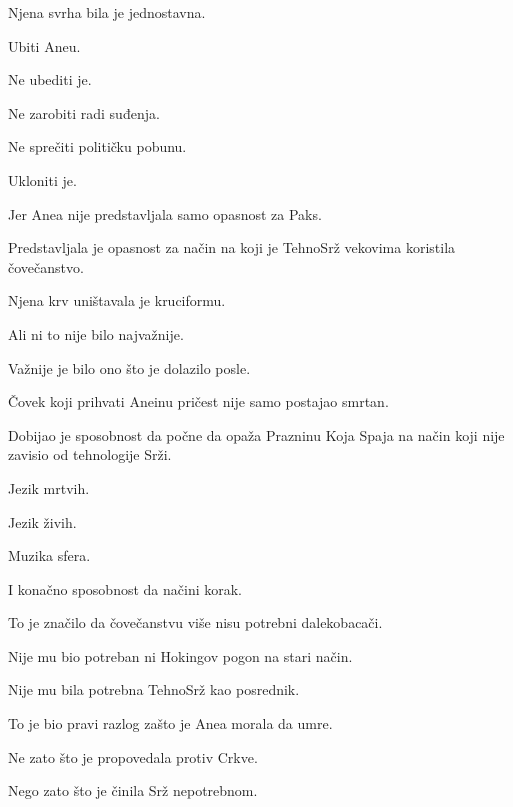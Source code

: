 \bigskip

Njena svrha bila je jednostavna.

Ubiti Aneu.

\bigskip

Ne ubediti je.

Ne zarobiti radi suđenja.

Ne sprečiti političku pobunu.

\bigskip

Ukloniti je.

\bigskip

Jer Anea nije predstavljala samo opasnost za Paks.

Predstavljala je opasnost za način na koji je TehnoSrž vekovima koristila čovečanstvo.

\bigskip

Njena krv uništavala je kruciformu.

\bigskip

Ali ni to nije bilo najvažnije.

\bigskip

Važnije je bilo ono što je dolazilo posle.

\bigskip

Čovek koji prihvati Aneinu pričest nije samo postajao smrtan.

Dobijao je sposobnost da počne da opaža Prazninu Koja Spaja na način koji nije zavisio od tehnologije Srži.

\bigskip

Jezik mrtvih.

Jezik živih.

Muzika sfera.

I konačno sposobnost da načini korak.

\bigskip

To je značilo da čovečanstvu više nisu potrebni dalekobacači.

Nije mu bio potreban ni Hokingov pogon na stari način.

\bigskip

Nije mu bila potrebna TehnoSrž kao posrednik.

\bigskip

To je bio pravi razlog zašto je Anea morala da umre.

\bigskip

Ne zato što je propovedala protiv Crkve.

\bigskip

Nego zato što je činila Srž nepotrebnom.

\bigskip

